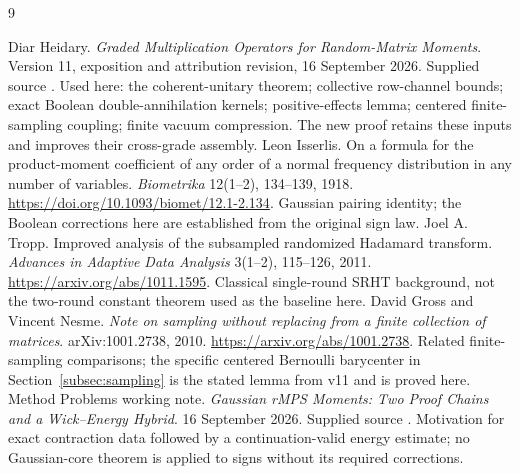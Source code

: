 \documentclass[11pt]{article}
\numberwithin{equation}{section}
\theoremstyle{definition}\newtheorem{definition}[theorem]{Definition}
\theoremstyle{remark}\newtheorem{remark}[theorem]{Remark}
\begin{document}
\clearpage
\begin{thebibliography}{9}\raggedright
{} Diar Heidary. \emph{Graded Multiplication Operators for Random-Matrix Moments}. Version 11, exposition and attribution revision, 16 September 2026. Supplied source . Used here: the coherent-unitary theorem; collective row-channel bounds; exact Boolean double-annihilation kernels; positive-effects lemma; centered finite-sampling coupling; finite vacuum compression. The new proof retains these inputs and improves their cross-grade assembly.
 Leon Isserlis. On a formula for the product-moment coefficient of any order of a normal frequency distribution in any number of variables. \emph{Biometrika} 12(1--2), 134--139, 1918. \url{https://doi.org/10.1093/biomet/12.1-2.134}. Gaussian pairing identity; the Boolean corrections here are established from the original sign law.
 Joel A. Tropp. Improved analysis of the subsampled randomized Hadamard transform. \emph{Advances in Adaptive Data Analysis} 3(1--2), 115--126, 2011. \url{https://arxiv.org/abs/1011.1595}. Classical single-round SRHT background, not the two-round constant theorem used as the baseline here.
 David Gross and Vincent Nesme. \emph{Note on sampling without replacing from a finite collection of matrices}. arXiv:1001.2738, 2010. \url{https://arxiv.org/abs/1001.2738}. Related finite-sampling comparisons; the specific centered Bernoulli barycenter in Section~\ref{subsec:sampling} is the stated lemma from v11 and is proved here.
 Method Problems working note. \emph{Gaussian rMPS Moments: Two Proof Chains and a Wick--Energy Hybrid}. 16 September 2026. Supplied source . Motivation for exact contraction data followed by a continuation-valid energy estimate; no Gaussian-core theorem is applied to signs without its required corrections.
\end{thebibliography}
\end{document}
